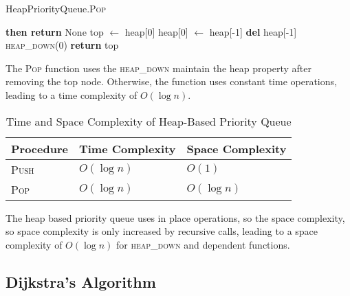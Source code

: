 \documentclass[12pt]{article}
\begin{document}
\begin{algorithm}[H]
    \caption{HeapPriorityQueue.\textsc{Pop}}
    \begin{algorithmic}[1]
            \State \textbf{then return} None
        \EndIf
        \State top $\gets$ heap[0]
        \State heap[0] $\gets$ heap[-1]
        \State \textbf{del} heap[-1]
        \State \textsc{heap\_down}(0) 
        \State \textbf{return} top
    \end{algorithmic}
\end{algorithm}

The \textsc{Pop} function uses the \textsc{heap\_down} maintain the heap property
after removing the top node. Otherwise, the function uses constant time operations,
leading to a time complexity of $O(\log{n})$.

\begin{table}[h!]
    \centering
    \begin{threeparttable}
        \caption{Time and Space Complexity of Heap-Based Priority Queue}
        \begin{tabular}{@{}lll@{}}
            \toprule
            \textbf{Procedure} & \textbf{Time Complexity} & \textbf{Space Complexity} \\ \midrule
            \textsc{Push}      & $O(\log n)$             & $O(1)$                    \\
            \textsc{Pop}       & $O(\log n)$             & $O(\log n)$                    \\
            \bottomrule
        \end{tabular}
    \end{threeparttable}
\end{table}

The heap based priority queue uses in place operations, so the space complexity,
so space complexity is only increased by recursive calls, leading to a space
complexity of $O(\log{n})$ for \textsc{heap\_down} and dependent functions.

\subsection{Dijkstra's Algorithm}
\end{document}
